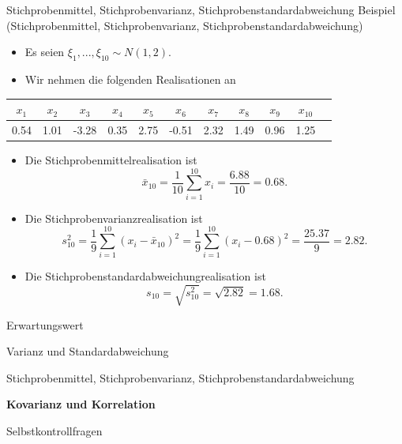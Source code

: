 \documentclass[
  8pt,
  ignorenonframetext,
]{beamer}
\providecommand{\tightlist}{%
  \setlength{\itemsep}{0pt}\setlength{\parskip}{0pt}}
\begin{document}
\begin{frame}{Stichprobenmittel, Stichprobenvarianz,
Stichprobenstandardabweichung}
\protect\hypertarget{stichprobenmittel-stichprobenvarianz-stichprobenstandardabweichung-1}{}
Beispiel (Stichprobenmittel, Stichprobenvarianz,
Stichprobenstandardabweichung) \vspace{2mm}

\footnotesize

\begin{itemize}
\tightlist
\item
  Es seien \(\xi_1,...,\xi_{10} \sim N(1,2)\).
\item
  Wir nehmen die folgenden Realisationen an
\end{itemize}

\begin{table}[h]
\begin{center}
\begin{tabular}{ccccccccccc}
   $x_1$
&  $x_2$
&  $x_3$
&  $x_4$
&  $x_5$
&  $x_6$
&  $x_7$
&  $x_8$
&  $x_9$
&  $x_{10}$ \\\hline
   0.54
&  1.01
& -3.28
&  0.35
&  2.75
& -0.51
&  2.32
&  1.49
&  0.96
&  1.25
\end{tabular}
\end{center}
\end{table}

\begin{itemize}
\tightlist
\item
  Die Stichprobenmittelrealisation ist \begin{equation}
  \bar{x}_{10}
  = \frac{1}{10}\sum_{i = 1}^{10}x_i
  = \frac{6.88}{10}
  = 0.68.
  \end{equation}
\item
  Die Stichprobenvarianzrealisation ist \begin{equation}
  s_{10}^2
  = \frac{1}{9}\sum_{i=1}^{10} (x_i - \bar{x}_{10})^2
  = \frac{1}{9}\sum_{i=1}^{10} (x_i - 0.68)^2
  = \frac{25.37}{9}
  = 2.82.
  \end{equation}
\item
  Die Stichprobenstandardabweichungrealisation ist \begin{equation}
  s_{10} = \sqrt{s_{10}^2} = \sqrt{2.82} = 1.68.
  \end{equation}
\end{itemize}
\end{frame}

\begin{frame}{}
\protect\hypertarget{section-9}{}
\large
\vfill

Erwartungswert

Varianz und Standardabweichung

Stichprobenmittel, Stichprobenvarianz, Stichprobenstandardabweichung

\textbf{Kovarianz und Korrelation}

Selbstkontrollfragen \vfill
\end{frame}
\end{document}
